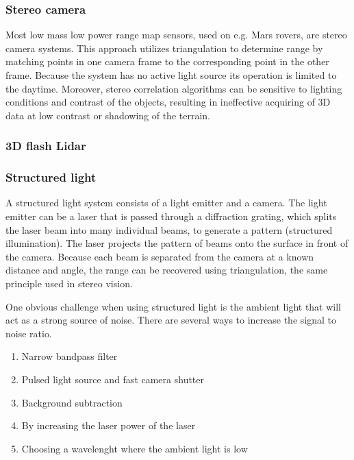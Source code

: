 \subsubsection{Stereo camera}
Most low mass low power range map sensors, used on e.g. Mars rovers, are stereo camera systems. This approach utilizes triangulation to determine range by matching points in one camera frame to the corresponding point in the other frame. Because the system has no active light source its operation is limited to the daytime.\cite{carl liebe et al} Moreover, stereo correlation algorithms can be sensitive to lighting conditions and contrast of the objects, resulting in ineffective acquiring of 3D data at low contrast or shadowing of the terrain.
 

\subsubsection{3D flash Lidar}

\subsubsection{Structured light}


A structured light system consists of a light emitter and a camera. The light emitter can be a laser that is passed through a diffraction grating, which splits the laser beam into many individual beams, to generate a pattern (structured illumination). The laser projects the pattern of beams onto the surface in front of the camera. Because each beam is separated from the camera at a known distance and angle, the range can be recovered using triangulation, the same principle used in stereo vision.  \cite{carl liebe et al}

One obvious challenge when using structured light is the ambient light that will act as a strong source of noise. There are several ways to increase the signal to noise ratio. 

\begin{enumerate}

\item Narrow bandpass filter
\item Pulsed light source and fast camera shutter
\item Background subtraction
\item By increasing the laser power of the laser
\item Choosing a wavelenght where the ambient light is low

\end{enumerate}


